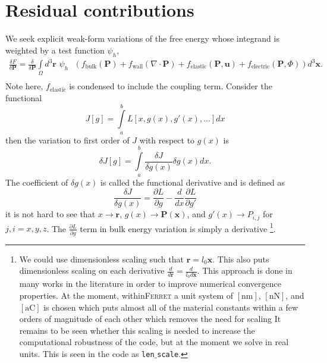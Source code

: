 \documentclass[16pt]{article} %
\begin{document}

%
\section{Residual contributions}
%
We seek explicit weak-form variations of the free energy whose integrand is weighted by a test function $\psi_h$,
%
\begin{eqnarray}\nonumber
\frac{\delta F}{\delta \textbf{P} }= \frac{\delta}{\delta \textbf{P}} \int\limits_\Omega d^3 \textbf{r} \,\,\psi_h \,\,\,\,\left( f_\mathrm{bulk} (\textbf{P}) + f_\mathrm{wall} (\nabla \cdot \textbf{P}) + f_\mathrm{elastic}(\textbf{P}, \textbf{u}) + f_\mathrm{electric}(\textbf{P}, \Phi) \right)d^3 {\boldsymbol x}. \\ \nonumber
\end{eqnarray}
%
Note here, $f_\mathrm{elastic}$ is condensed to include the coupling term. Consider the functional
%
$$J[g] = \int\limits_a^b L[x, g(x), g'(x),...]dx$$
%
then the variation to first order of $J$ with respect to $g(x)$ is
%
$$\delta J[g] = \int\limits_a^b \frac{\delta J}{\delta g(x)} \delta g(x) dx.$$
%
The coefficient of $\delta g(x)$ is called the functional derivative and is defined as
%
\begin{equation}\tag{13}
\frac{\delta J}{\delta g(x)} = \frac{\partial L}{\partial g} - \frac{d}{dx} \frac{\partial L}{\partial g'}
\end{equation}
%
it is not hard to see that $x \to \textbf{r}$, $g(x) \to \textbf{P} ({\boldsymbol x})$, and $g'(x) \to P_{i,j}$ for $j,i = x,y,z$. The $\frac{\partial L}{\partial g}$ term in bulk energy variation is simply a derivative \footnote[1]{%
We could use dimensionless scaling such that $\textbf{r} = l_0 {\boldsymbol x}$.
%
This also puts dimensionless scaling on each derivative $\frac{d}{d \textbf{r}} = \frac{d}{l_0 d{\boldsymbol x}}$. 
%
This approach is done in many works in the literature \cite{Li2001, Ng2012} in order to improve numerical convergence properties.
%
At the moment, within\textsc{Ferret} a unit system of $[\mathrm{nm}]$, $[\mathrm{nN}]$, and $[\mathrm{aC}]$ is chosen which puts almost all of the material constants within a few orders of magnitude of each other which removes the need for scaling
%
It remains to be seen whether this scaling is needed to increase the computational robustness of the code, but at the moment we solve in real units. 
%
This is seen in the code as \texttt{len$\_$scale}.}. 
\end{document}
